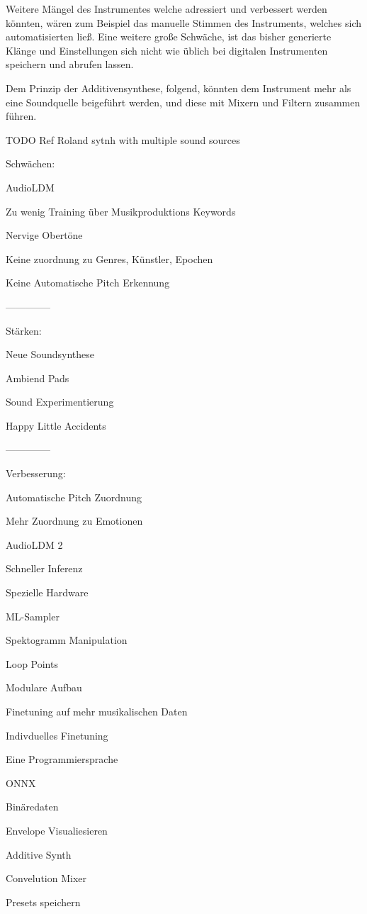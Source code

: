 \documentclass[
  a4paper,  %
  twoside,  %
  bibliography=totoc,
  headsepline,
  cleardoublepage=empty,
  parskip=half,
  draft=false
]{scrbook}
\begin{document}
Weitere Mängel des Instrumentes welche adressiert und verbessert werden könnten, wären zum Beispiel das manuelle Stimmen des Instruments, welches sich automatisierten ließ. Eine weitere große Schwäche, ist das bisher generierte Klänge und Einstellungen sich nicht wie üblich bei digitalen Instrumenten speichern und abrufen lassen. 

Dem Prinzip der Additivensynthese, folgend, könnten dem Instrument mehr als eine Soundquelle beigeführt werden, und diese mit Mixern und Filtern zusammen führen. 


TODO Ref Roland sytnh with multiple sound sources  

Schwächen:

AudioLDM

Zu wenig Training über Musikproduktions Keywords

Nervige Obertöne

Keine zuordnung zu Genres, Künstler, Epochen

Keine Automatische Pitch Erkennung

--------------

Stärken:

Neue Soundsynthese

Ambiend Pads

Sound Experimentierung

Happy Little Accidents


--------------

Verbesserung:

Automatische Pitch Zuordnung

Mehr Zuordnung zu Emotionen 

AudioLDM 2

Schneller Inferenz

Spezielle Hardware 

ML-Sampler

Spektogramm Manipulation 

Loop Points

Modulare Aufbau 

Finetuning auf mehr musikalischen Daten

Indivduelles Finetuning 

Eine Programmiersprache

ONNX

Binäredaten

Envelope Visualiesieren

Additive Synth

Convelution Mixer

Presets speichern 
\end{document}

